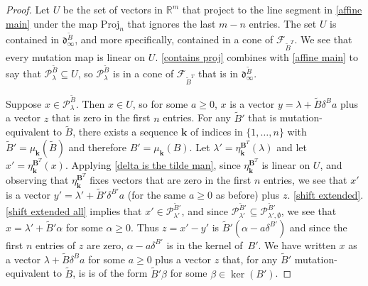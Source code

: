 \documentclass{amsart}
\theoremstyle{definition}
\theoremstyle{remark}
\numberwithin{equation}{section}
\newcommand{\reals}{\mathbb R}
\newcommand{\set}[1]{{\lbrace #1 \rbrace}}
\newcommand{\sett}[1]{{\bigl\lbrace #1 \bigr\rbrace}}
\newcommand{\F}{{\mathcal F}}
\newcommand{\0}{{\mathbf{0}}}
\newcommand{\Proj}{\mathrm{Proj}}
\newcommand{\kk}{{\boldsymbol{k}}}
\newcommand{\tB}{{\tilde{B}}}
\newcommand{\BB}{\mathbf{B}}
\renewcommand{\P}{\mathcal{P}}
\renewcommand{\d}{{\mathfrak d}}
\begin{document}
\begin{proof}
%
%
%
%
Let $U$ be the set of vectors in $\reals^m$ that project to the line segment in \cref{affine main} under the map $\Proj_n$ that ignores the last $m-n$ entries.
The set $U$ is contained in $\d_\infty^\tB$, and more specifically, contained in a cone of $\F_{\tB^T}$.
We see that every mutation map is linear on $U$.
\cref{contains proj} combines with \cref{affine main} to say that $\P^\tB_\lambda\subseteq U$, so $\P^\tB_\lambda$ is in a cone of $\F_{\tB^T}$ that is in $\d_\infty^\tB$.

Suppose $x\in\P^\tB_\lambda$.
Then $x\in U$, so for some $a\ge0$, $x$ is a vector $y=\lambda+\tB\delta^Ba$ plus a vector $z$ that is zero in the first $n$ entries.
For any $\tB'$ that is mutation-equivalent to $\tB$, there exists a sequence $\kk$ of indices in $\set{1,\ldots,n}$ with $\tB'=\mu_\kk(\tB)$ and therefore $B'=\mu_\kk(B)$.
Let $\lambda'=\eta_\kk^{\BB^T}(\lambda)$ and let $x'=\eta_\kk^{\BB^T}(x)$.
Applying \cref{delta is the tilde man}, since $\eta_\kk^{\BB^T}$ is linear on $U$, and observing that $\eta_\kk^{\BB^T}$ fixes vectors that are zero in the first $n$ entries, we see that $x'$ is a vector $y'=\lambda'+\tB'\delta^{B'}a$ (for the same $a\ge0$ as before) plus $z$.
\cref{shift extended}.\ref{shift extended all} implies that $x'\in\P^{\tB'}_{\lambda'}$, and since $\P^{\tB'}_{\lambda'}\subseteq\P^{\tB'}_{\lambda',\emptyset}$, we see that $x=\lambda'+\tB'\alpha$ for some ${\alpha\ge0}$.
Thus $z=x'-y'$ is $\tB'(\alpha-a\delta^{B'})$ and since the first $n$ entries of $z$ are zero, $\alpha-a\delta^{B'}$ is in the kernel of~$B'$.
We have written $x$ as a vector $\lambda+\tB\delta^Ba$ for some $a\ge0$ plus a vector $z$ that, for any $\tB'$ mutation-equivalent to $\tB$, is is of the form $\tB'\beta$ for some $\beta\in\ker(B')$.
\end{proof}
\end{document}
